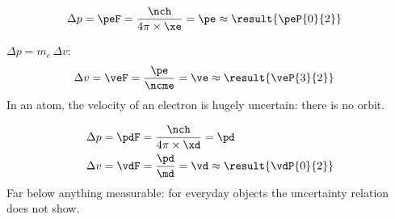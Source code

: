 \begin{abcliste}
\abc
\begin{align}
 \Delta p &= \peF = \frac{\nch}{4\pi\times\xe} = \pe \approx \result{\peP{0}{2}}
\end{align}

\abc $\Delta p = m_e\,\Delta v$:
\begin{align}
 \Delta v &= \veF = \frac{\pe}{\ncme} = \ve \approx \result{\veP{3}{2}}
\end{align}
In an atom, the velocity of an electron is hugely uncertain: there is no orbit.

\abc
\begin{align}
 \Delta p &= \pdF = \frac{\nch}{4\pi\times\xd} = \pd \\
 \Delta v &= \vdF = \frac{\pd}{\md} = \vd \approx \result{\vdP{0}{2}}
\end{align}
Far below anything measurable: for everyday objects the uncertainty relation does not show.
\end{abcliste}
